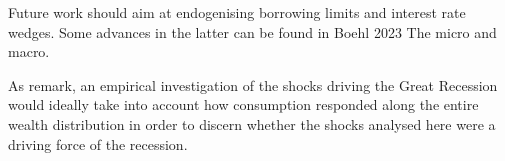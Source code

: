 \documentclass[12pt]{article} %
\numberwithin{equation}{section} %
\numberwithin{figure}{section}
\numberwithin{table}{section}
\begin{document}
Future work should aim at endogenising borrowing limits and interest rate wedges. Some advances in the latter can be found in Boehl 2023 The micro and macro.

As \textcite{kv2018} remark, an empirical investigation of the shocks driving the  Great Recession would ideally take into account how consumption responded along the entire wealth distribution in order to discern whether the shocks analysed here were a driving force of the recession.

\newpage
\thispagestyle{plain}
\printbibliography[heading=bibintoc] %
\end{document}
